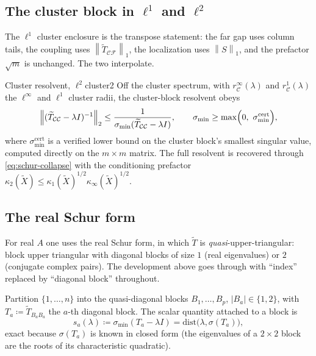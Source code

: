 \documentclass[11pt, a4paper]{article}
\numberwithin{equation}{section}
\newcommand{\norm}[1]{\left\|#1\right\|}
\newcommand{\abs}[1]{\left|#1\right|}
\newcommand{\tX}{\widetilde{X}}
\newcommand{\tT}{\widetilde{T}}
\begin{document}
\subsection{The cluster block in $\ell^1$ and $\ell^2$}

The $\ell^1$ cluster enclosure is the transpose statement: the far gap uses
column tails, the coupling uses $\norm{\tT_{\mathcal{C}\mathcal{F}}}_1$, the
localization uses $\norm{S}_1$, and the prefactor $\sqrt m$ is unchanged.  The
two interpolate.

\begin{corollary}{Cluster resolvent, $\ell^2$}{cluster2}
  Off the cluster spectrum, with $r_{\mathcal{C}}^{\infty}(\lambda)$ and
  $r_{\mathcal{C}}^{1}(\lambda)$ the $\ell^\infty$ and $\ell^1$ cluster radii,
  the cluster-block resolvent obeys
  \[
    \norm{(\tT_{\mathcal{C}\mathcal{C}} - \lambda I)^{-1}}_2
      \le \frac{1}{\sigma_{\min}(\tT_{\mathcal{C}\mathcal{C}} - \lambda I)},
    \qquad
    \sigma_{\min} \ge \max\Bigl(0,\ \sigma_{\min}^{\mathrm{cert}}\Bigr),
  \]
  where $\sigma_{\min}^{\mathrm{cert}}$ is a verified lower bound on the cluster
  block's smallest singular value, computed directly on the $m\times m$ matrix.
  The full resolvent is recovered through \eqref{eq:schur-collapse} with the
  conditioning prefactor $\kappa_2(\tX) \le \kappa_1(\tX)^{1/2}
  \kappa_\infty(\tX)^{1/2}$.
\end{corollary}

\subsection{The real Schur form}

For real $A$ one uses the real Schur form, in which $\tT$ is
\emph{quasi}-upper-triangular: block upper triangular with diagonal blocks of
size $1$ (real eigenvalues) or $2$ (conjugate complex pairs).  The development
above goes through with ``index'' replaced by ``diagonal block'' throughout.

Partition $\{1,\ldots,n\}$ into the quasi-diagonal blocks $B_1, \ldots, B_p$,
$\abs{B_a}\in\{1,2\}$, with $T_a \coloneqq \tT_{B_a B_a}$ the $a$-th diagonal
block.  The scalar quantity attached to a block is
\[
  s_a(\lambda) \coloneqq \sigma_{\min}(T_a - \lambda I)
    = \mathrm{dist}\bigl(\lambda, \sigma(T_a)\bigr),
\]
exact because $\sigma(T_a)$ is known in closed form (the eigenvalues of a
$2\times 2$ block are the roots of its characteristic quadratic).
\end{document}
